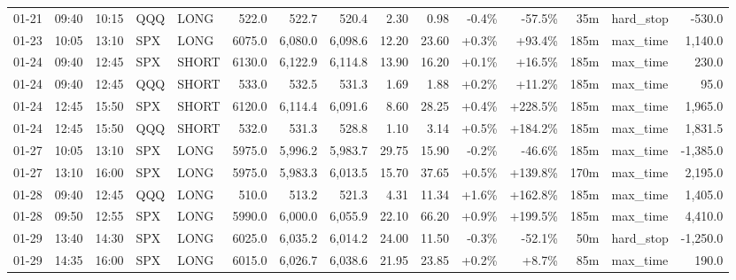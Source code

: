 \documentclass[11pt,a4paper,twoside]{article}
\begin{document}
\begin{landscape}
\begin{center}
\begin{longtable}{>{\color{txtmain}}l l l l l r r r r r r r r >{\color{txtmain}}l r}
01-21 & 09:40 & 10:15 & QQQ & LONG & 522.0 & 522.7 & 520.4 & 2.30 & 0.98 & \textcolor{lossred}{-0.4\%} & \textcolor{lossred}{-57.5\%} & 35m & hard\_stop & \textcolor{lossred}{-530.0} \\
01-23 & 10:05 & 13:10 & SPX & LONG & 6075.0 & 6,080.0 & 6,098.6 & 12.20 & 23.60 & \textcolor{wingreen}{+0.3\%} & \textcolor{wingreen}{+93.4\%} & 185m & max\_time & \textcolor{wingreen}{1,140.0} \\
01-24 & 09:40 & 12:45 & SPX & SHORT & 6130.0 & 6,122.9 & 6,114.8 & 13.90 & 16.20 & \textcolor{wingreen}{+0.1\%} & \textcolor{wingreen}{+16.5\%} & 185m & max\_time & \textcolor{wingreen}{230.0} \\
01-24 & 09:40 & 12:45 & QQQ & SHORT & 533.0 & 532.5 & 531.3 & 1.69 & 1.88 & \textcolor{wingreen}{+0.2\%} & \textcolor{wingreen}{+11.2\%} & 185m & max\_time & \textcolor{wingreen}{95.0} \\
01-24 & 12:45 & 15:50 & SPX & SHORT & 6120.0 & 6,114.4 & 6,091.6 & 8.60 & 28.25 & \textcolor{wingreen}{+0.4\%} & \textcolor{wingreen}{+228.5\%} & 185m & max\_time & \textcolor{wingreen}{1,965.0} \\
01-24 & 12:45 & 15:50 & QQQ & SHORT & 532.0 & 531.3 & 528.8 & 1.10 & 3.14 & \textcolor{wingreen}{+0.5\%} & \textcolor{wingreen}{+184.2\%} & 185m & max\_time & \textcolor{wingreen}{1,831.5} \\
01-27 & 10:05 & 13:10 & SPX & LONG & 5975.0 & 5,996.2 & 5,983.7 & 29.75 & 15.90 & \textcolor{lossred}{-0.2\%} & \textcolor{lossred}{-46.6\%} & 185m & max\_time & \textcolor{lossred}{-1,385.0} \\
01-27 & 13:10 & 16:00 & SPX & LONG & 5975.0 & 5,983.3 & 6,013.5 & 15.70 & 37.65 & \textcolor{wingreen}{+0.5\%} & \textcolor{wingreen}{+139.8\%} & 170m & max\_time & \textcolor{wingreen}{2,195.0} \\
01-28 & 09:40 & 12:45 & QQQ & LONG & 510.0 & 513.2 & 521.3 & 4.31 & 11.34 & \textcolor{wingreen}{+1.6\%} & \textcolor{wingreen}{+162.8\%} & 185m & max\_time & \textcolor{wingreen}{1,405.0} \\
01-28 & 09:50 & 12:55 & SPX & LONG & 5990.0 & 6,000.0 & 6,055.9 & 22.10 & 66.20 & \textcolor{wingreen}{+0.9\%} & \textcolor{wingreen}{+199.5\%} & 185m & max\_time & \textcolor{wingreen}{4,410.0} \\
01-29 & 13:40 & 14:30 & SPX & LONG & 6025.0 & 6,035.2 & 6,014.2 & 24.00 & 11.50 & \textcolor{lossred}{-0.3\%} & \textcolor{lossred}{-52.1\%} & 50m & hard\_stop & \textcolor{lossred}{-1,250.0} \\
01-29 & 14:35 & 16:00 & SPX & LONG & 6015.0 & 6,026.7 & 6,038.6 & 21.95 & 23.85 & \textcolor{wingreen}{+0.2\%} & \textcolor{wingreen}{+8.7\%} & 85m & max\_time & \textcolor{wingreen}{190.0} \\

\end{longtable}
\end{center}
\end{landscape}
\end{document}
